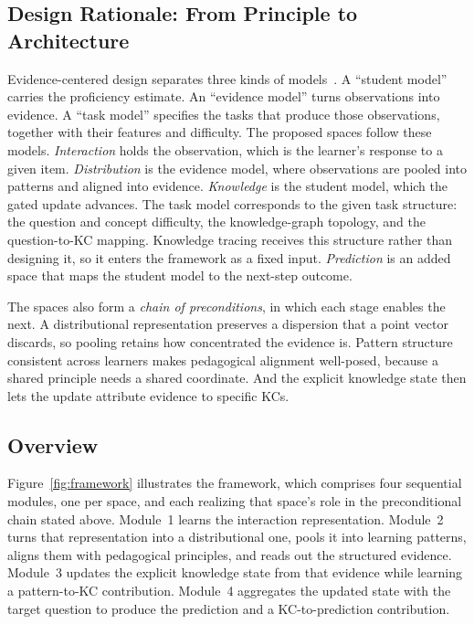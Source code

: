 \documentclass[conference]{IEEEtran}
\begin{document}
\subsection{Design Rationale: From Principle to Architecture}
\label{sec:rationale}

Evidence-centered design separates three kinds of models~\cite{mislevy2005ecd}. A ``student model'' carries the proficiency estimate. An ``evidence model'' turns observations into evidence. A ``task model'' specifies the tasks that produce those observations, together with their features and difficulty. The proposed spaces follow these models. \emph{Interaction} holds the observation, which is the learner's response to a given item. \emph{Distribution} is the evidence model, where observations are pooled into patterns and aligned into evidence. \emph{Knowledge} is the student model, which the gated update advances. The task model corresponds to the given task structure: the question and concept difficulty, the knowledge-graph topology, and the question-to-KC mapping. Knowledge tracing receives this structure rather than designing it, so it enters the framework as a fixed input. \emph{Prediction} is an added space that maps the student model to the next-step outcome.

The spaces also form a \emph{chain of preconditions}, in which each stage enables the next. A distributional representation preserves a dispersion that a point vector discards, so pooling retains how concentrated the evidence is. Pattern structure consistent across learners makes pedagogical alignment well-posed, because a shared principle needs a shared coordinate. And the explicit knowledge state then lets the update attribute evidence to specific KCs.

\subsection{Overview}

Figure~\ref{fig:framework} illustrates the framework, which comprises four sequential modules, one per space, and each realizing that space's role in the preconditional chain stated above. Module~1 learns the interaction representation. Module~2 turns that representation into a distributional one, pools it into learning patterns, aligns them with pedagogical principles, and reads out the structured evidence. Module~3 updates the explicit knowledge state from that evidence while learning a pattern-to-KC contribution. Module~4 aggregates the updated state with the target question to produce the prediction and a KC-to-prediction contribution.
\end{document}
